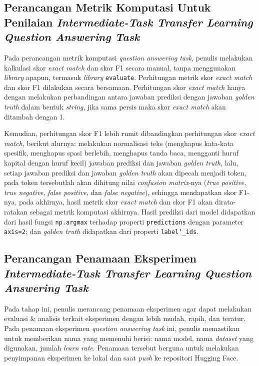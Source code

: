 \subsection{Perancangan Metrik Komputasi Untuk Penilaian \emph{Intermediate-Task Transfer Learning Question Answering Task}}
Pada perancangan metrik komputasi \emph{question answering task}, penulis melakukan kalkulasi skor \emph{exact match} dan skor F1 secara manual, tanpa menggunakan \emph{library} apapun, termasuk \emph{library} \texttt{evaluate}. Perhitungan metrik skor \emph{exact match} dan skor F1 dilakukan secara bersamaan. Perhitungan skor \emph{exact match} hanya dengan melakukan perbandingan antara jawaban prediksi dengan jawaban \emph{golden truth} dalam bentuk \emph{string}, jika sama persis maka skor \emph{exact match} akan ditambah dengan 1. 

Kemudian, perhitungan skor F1 lebih rumit dibandingkan perhitungan skor \emph{exact match}, berikut alurnya: melakukan normalisasi teks (menghapus kata-kata spesifik, menghapus spasi berlebih, menghapus tanda baca, mengganti huruf kapital dengan huruf kecil) jawaban prediksi dan jawaban \emph{golden truth}, lalu, setiap jawaban prediksi dan jawaban \emph{golden truth} akan dipecah menjadi token, pada token tersebutlah akan dihitung nilai \emph{confusion matrix}-nya (\emph{true positive}, \emph{true negative}, \emph{false positive}, dan \emph{false negative}), sehingga mendapatkan skor F1-nya, pada akhirnya, hasil metrik skor \emph{exact match} dan skor F1 akan dirata-ratakan sebagai metrik komputasi akhirnya. Hasil prediksi dari model didapatkan dari hasil fungsi \texttt{np.argmax} terhadap properti \texttt{predictions} dengan parameter \texttt{axis=2}; dan \emph{golden truth} didapatkan dari properti \texttt{label\char`_ids}. 

\subsection{Perancangan Penamaan Eksperimen \emph{Intermediate-Task Transfer Learning Question Answering Task}}
Pada tahap ini, penulis merancang penamaan eksperimen agar dapat melakukan evaluasi \& analisis terkait eksperimen dengan lebih mudah, rapih, dan teratur. Pada penamaan eksperimen \emph{question answering task} ini, penulis memastikan untuk memberikan nama yang memenuhi berisi: nama model, nama \emph{dataset} yang digunakan, jumlah \emph{learn rate}. Penamaan tersebut berguna untuk melakukan penyimpanan eksperimen ke lokal dan saat \emph{push} ke repositori Hugging Face. 

